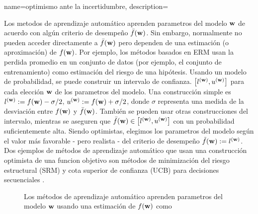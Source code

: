 {name={optimismo ante la incertidumbre},
	description={Los metodos de aprendizaje automático aprenden parametros del modelo ${\bf w}$ 
		de acuerdo con algún criterio de desempeño $\bar{f}({\bf w})$. Sin embargo, normalmente 
		no pueden acceder directamente a $\bar{f}({\bf w})$  pero dependen de una estimación (o aproximación) de $f({\bf w})$. 
		Por ejemplo, los métodos basados en ERM usan la perdida promedio en un conjunto de datos (por ejemplo, el conjunto de entrenamiento) 
		como estimación del riesgo de una hipótesis. Usando un modelo de probabilidad, se puede construir 
		un intervalo de confianza. 
	$\big[ l^{({\bf w})},  u^{({\bf w})} \big]$ para cada elección ${\bf w}$ de los parametros del modelo.
	Una construcción simple es $l^{({\bf w})} := f({\bf w}) - \sigma/2$, $u^{({\bf w})} := f({\bf w})+ \sigma/2$, 
	donde $\sigma$ representa una medida de la desviación entre $f({\bf w})$ y $\bar{f}({\bf w})$. 
	También se pueden usar otras construcciones del intervalo, mientras se aseguren que $\bar{f}({\bf w}) \in\big[ l^{({\bf w})},  u^{({\bf w})} \big]$ 
	con un probabilidad suficientemente alta. Siendo optimistas, elegimos los parametros del modelo 
	según el valor más favorable - pero realista - del criterio de desempeño $\tilde{f}({\bf w}) :=  l^{({\bf w})}$. 
	Dos ejemplos de métodos de aprendizaje automático que usan una construcción optimista de una funcion objetivo 
	son métodos de minimización del riesgo estructural (SRM) \cite[Ch. 11]{ShalevMLBook} y cota superior de confianza (UCB) para decisiones secuenciales \cite[Sec. 2.2]{Bubeck2012}. 
		\begin{figure}[H]
				\begin{center}
\caption{Los métodos de aprendizaje automático aprenden parametros del modelo ${\bf w}$ usando una estimación de $f({\bf w})$ como 
}
\end{center}
\end{figure}}}

